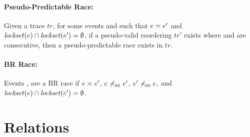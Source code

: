 \documentclass[letter,10pt]{article}
\newcommand{\lockset}[1]{\ensuremath{\mathit{lockset}(#1)}\xspace}
\newcommand{\commonLocks}[2]{\ensuremath{\lockset{#1} \cap \lockset{#2}}}
\newcommand{\conflicts}[2]{\ensuremath{#1 \asymp #2}} %
\newcommand{\tr}{\ensuremath{\mathit{tr}}\xspace}
\newcommand{\trPrime}{\ensuremath{\mathit{tr'}}\xspace}
\newcommand{\BR}{BR\xspace}
\newcommand{\nltBR}{\ensuremath{\not\prec_\textsc{\tiny{\BR}}}\xspace}
\newcommand{\Ordered}[3]{\ensuremath{#1 #2 #3}}
\newcommand{\nBROrdered}[2]{\Ordered{#1}{\nltBR}{#2}}
\newcommand{\originalgrumbler}[2]{\begin{quote}\textcolor{blue}{\sl{\bf #1 says:} #2}\end{quote}}
\newcommand{\grumbler}[2]{\originalgrumbler{#1}{#2}}
\newcommand{\kaan}[1]{\grumbler{Kaan}{#1}}
\begin{document}
\paragraph{Pseudo-Predictable Race:} Given a trace \tr, for some events 
and  such that \conflicts{\event{e}}{\event{e}{'}} and
$\commonLocks{\event{e}{}}{\event{e}{'}} = \emptyset$, if a pseudo-valid
reordering \trPrime exists where  and  are consecutive,
then a pseudo-predictable race exists in \tr.



\paragraph{\BR Race:} Events ,  are a \BR race if
\conflicts{\event{e}{}}{\event{e}{'}}, \nBROrdered{\event{e}{}}{\event{e}{'}},
\nBROrdered{\event{e}{'}}{\event{e}{}}, and $\commonLocks{\event{e}{}}{\event{e}{'}} = \emptyset$.

\section{Relations}
\end{document}
